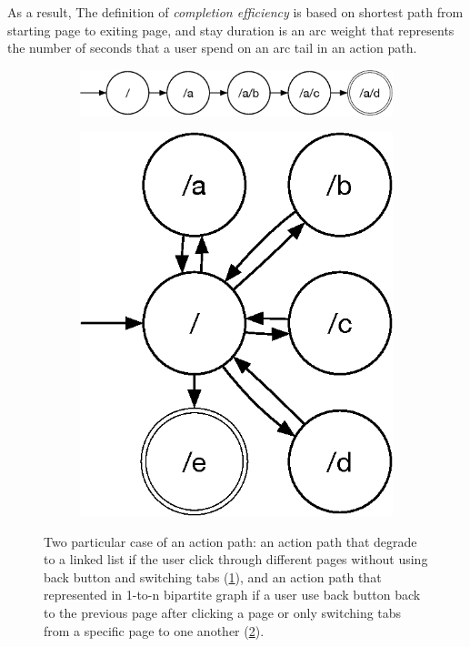 As a result, The definition of \emph{completion efficiency} is based on shortest path from 
starting page to exiting page, and stay duration is an arc weight that represents 
the number of seconds that a user spend on an arc tail in an action path.

\begin{figure}[H]
    \centering

\begin{subfigure}[b]{0.55\textwidth}
    \includegraphics[width=1\textwidth]{figures/linked-list}
    \caption{}
    \label{fig:sim-action-1}
\end{subfigure}
    
\begin{subfigure}[b]{0.23\textwidth}
    \includegraphics[width=1\textwidth]{figures/1ton}
    \caption{}
    \label{fig:sim-action-2}
\end{subfigure}

\caption{Two particular case of an action path: an action path that degrade to 
a linked list if the user click through different pages without using back button and 
switching tabs (\ref{fig:sim-action-1}), and an action path that represented 
in 1-to-n bipartite graph if a user use back button back to the previous page after 
clicking a page or only switching tabs from a specific page to one another (\ref{fig:sim-action-2}).}
\label{fig:sim-action-path}
\end{figure}

